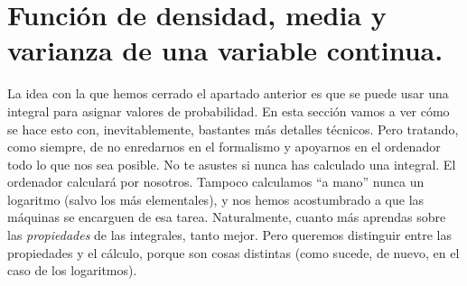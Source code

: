 \section{Función de densidad, media y varianza de una variable continua.}
\label{cap05:sec:MasDetallesSobreDistribucionesContinuas}

La idea con la que hemos cerrado el apartado anterior es que se puede usar una integral para asignar valores de probabilidad. En esta sección vamos a ver cómo se hace esto con, inevitablemente, bastantes más detalles técnicos. Pero tratando, como siempre, de no enredarnos en el formalismo y apoyarnos en el ordenador todo lo que nos sea posible. No te asustes si nunca has calculado una integral. El ordenador calculará por nosotros. Tampoco calculamos ``a mano'' nunca un logaritmo (salvo los más elementales), y nos hemos acostumbrado a que las máquinas se encarguen de esa tarea. Naturalmente, cuanto más aprendas sobre las {\em propiedades} de las integrales, tanto mejor. Pero queremos distinguir entre las propiedades y el cálculo, porque son cosas distintas (como sucede, de nuevo, en el caso de los logaritmos).

